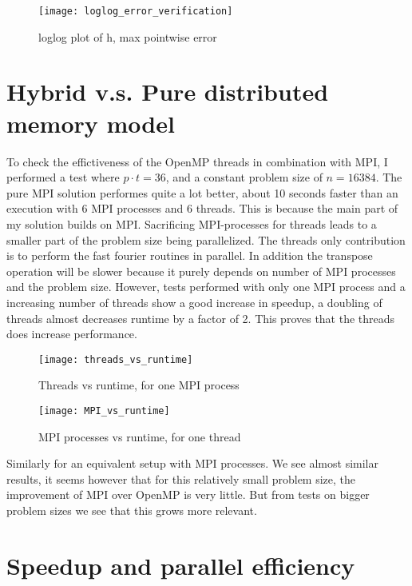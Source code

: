 \begin{figure}[H]
	\centering
	\texttt{[image: loglog\_error\_verification]}
	\caption{loglog plot of h, max pointwise error}
	\label{fig:loglogerror}
\end{figure}

\section{Hybrid v.s. Pure distributed memory model}
To check the effictiveness of the OpenMP threads in combination with MPI, I performed a test where $p\cdot t = 36$, and a constant problem size of $n = 16384$. The pure MPI solution performes quite a lot better, about 10 seconds faster than an execution with 6 MPI processes and 6 threads. This is because the main part of my solution builds on MPI. Sacrificing MPI-processes for threads leads to a smaller part of the problem size being parallelized. The threads only contribution is to perform the fast fourier routines in parallel. In addition the transpose operation will be slower because it purely depends on number of MPI processes and the problem size. 
However, tests performed with only one MPI process and a increasing number of threads show a good increase in speedup, a doubling of threads almost decreases runtime by a factor of 2. This proves that the threads does increase performance.

\begin{figure}[htbp]
	\centering
	\texttt{[image: threads\_vs\_runtime]}
	\caption{Threads vs runtime, for one MPI process}
	\label{fig:threadsnruntime}
\end{figure}
\begin{figure}[htbp]
	\centering
	\texttt{[image: MPI\_vs\_runtime]}
	\caption{MPI processes vs runtime, for one thread}
	\label{fig:MPInruntime}
\end{figure}

Similarly for an equivalent setup with MPI processes. We see almost similar results, it seems however that for this relatively small problem size, the improvement of MPI over OpenMP is very little. But from tests on bigger problem sizes we see that this grows more relevant.


\section{Speedup and parallel efficiency}


